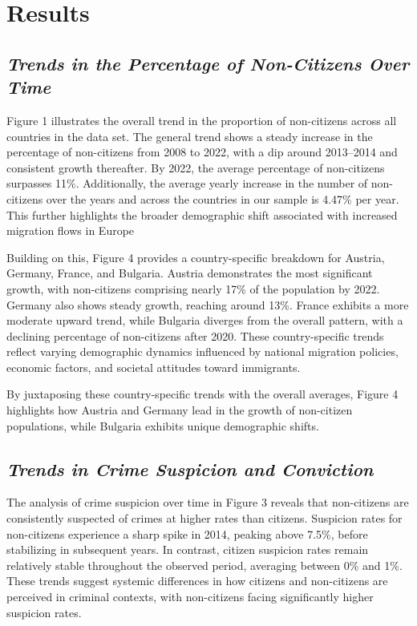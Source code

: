 \documentclass[
]{article}
\begin{document}
\section{Results}\label{results}

\subsection{\texorpdfstring{\emph{Trends in the Percentage of
Non-Citizens Over
Time}}{Trends in the Percentage of Non-Citizens Over Time}}\label{trends-in-the-percentage-of-non-citizens-over-time}

Figure 1 illustrates the overall trend in the proportion of non-citizens
across all countries in the data set. The general trend shows a steady
increase in the percentage of non-citizens from 2008 to 2022, with a dip
around 2013--2014 and consistent growth thereafter. By 2022, the average
percentage of non-citizens surpasses 11\%. Additionally, the average
yearly increase in the number of non-citizens over the years and across
the countries in our sample is 4.47\% per year. This further highlights
the broader demographic shift associated with increased migration flows
in Europe

Building on this, Figure 4 provides a country-specific breakdown for
Austria, Germany, France, and Bulgaria. Austria demonstrates the most
significant growth, with non-citizens comprising nearly 17\% of the
population by 2022. Germany also shows steady growth, reaching around
13\%. France exhibits a more moderate upward trend, while Bulgaria
diverges from the overall pattern, with a declining percentage of
non-citizens after 2020. These country-specific trends reflect varying
demographic dynamics influenced by national migration policies, economic
factors, and societal attitudes toward immigrants.

By juxtaposing these country-specific trends with the overall averages,
Figure 4 highlights how Austria and Germany lead in the growth of
non-citizen populations, while Bulgaria exhibits unique demographic
shifts.

\subsection{\texorpdfstring{\emph{Trends in Crime Suspicion and
Conviction}}{Trends in Crime Suspicion and Conviction}}\label{trends-in-crime-suspicion-and-conviction}

The analysis of crime suspicion over time in Figure 3 reveals that
non-citizens are consistently suspected of crimes at higher rates than
citizens. Suspicion rates for non-citizens experience a sharp spike in
2014, peaking above 7.5\%, before stabilizing in subsequent years. In
contrast, citizen suspicion rates remain relatively stable throughout
the observed period, averaging between 0\% and 1\%. These trends suggest
systemic differences in how citizens and non-citizens are perceived in
criminal contexts, with non-citizens facing significantly higher
suspicion rates.
\end{document}

